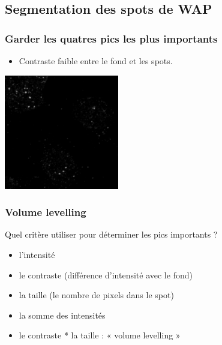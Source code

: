 \documentclass{beamer}
\begin{document}
    
    
  \subsection{Segmentation des spots de WAP}
    
    \frame
    {
      \frametitle{Garder les quatres pics les plus importants}
      \begin{itemize}
        \item Contraste faible entre le fond et les spots.
      \end{itemize}
      \begin{center}
        \includegraphics[height=5cm]{wap-gauss.png}
      \end{center}
    }
  
    \frame
    {
      \frametitle{Volume levelling}
      Quel critère utiliser pour déterminer les pics importants ?
      \begin{itemize}
        \item<1-> l'intensité
        \item<1-> le contraste (différence d'intensité avec le fond)
        \item<2-> la taille (le nombre de pixels dans le spot)
        \item<3-> la somme des intensités
        \item<3-> \alert<4>{le contraste * la taille : « volume levelling »}
      \end{itemize}
    }
  
\end{document}
